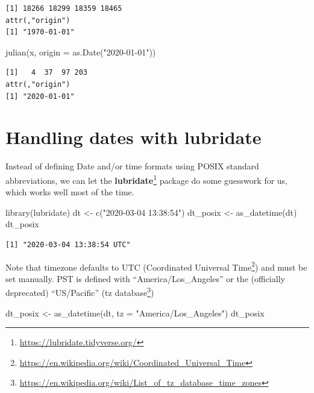 \documentclass[
]{book}
\newenvironment{Shaded}{\begin{snugshade}}{\end{snugshade}}
\newcommand{\AttributeTok}[1]{\textcolor[rgb]{0.77,0.63,0.00}{#1}}
\newcommand{\FunctionTok}[1]{\textcolor[rgb]{0.00,0.00,0.00}{#1}}
\newcommand{\NormalTok}[1]{#1}
\newcommand{\OtherTok}[1]{\textcolor[rgb]{0.56,0.35,0.01}{#1}}
\newcommand{\StringTok}[1]{\textcolor[rgb]{0.31,0.60,0.02}{#1}}
\DeclareRobustCommand{\href}[2]{#2\footnote{\url{#1}}}
\begin{document}
\begin{verbatim}
[1] 18266 18299 18359 18465
attr(,"origin")
[1] "1970-01-01"
\end{verbatim}

\begin{Shaded}
\begin{Highlighting}[]
\FunctionTok{julian}\NormalTok{(x, }\AttributeTok{origin =} \FunctionTok{as.Date}\NormalTok{(}\StringTok{"2020{-}01{-}01"}\NormalTok{))}
\end{Highlighting}
\end{Shaded}

\begin{verbatim}
[1]   4  37  97 203
attr(,"origin")
[1] "2020-01-01"
\end{verbatim}

\hypertarget{handling-dates-with-lubridate}{%
\section{\texorpdfstring{Handling dates with \textbf{lubridate}}{Handling dates with lubridate}}\label{handling-dates-with-lubridate}}

Instead of defining Date and/or time formats using POSIX standard abbreviations, we can let the \href{https://lubridate.tidyverse.org/}{\textbf{lubridate}} package do some guesswork for us, which works well most of the time.

\begin{Shaded}
\begin{Highlighting}[]
\FunctionTok{library}\NormalTok{(lubridate)}
\NormalTok{dt }\OtherTok{\textless{}{-}} \FunctionTok{c}\NormalTok{(}\StringTok{"2020{-}03{-}04 13:38:54"}\NormalTok{)}
\NormalTok{dt\_posix }\OtherTok{\textless{}{-}} \FunctionTok{as\_datetime}\NormalTok{(dt)}
\NormalTok{dt\_posix}
\end{Highlighting}
\end{Shaded}

\begin{verbatim}
[1] "2020-03-04 13:38:54 UTC"
\end{verbatim}

Note that timezone defaults to UTC (\href{https://en.wikipedia.org/wiki/Coordinated_Universal_Time}{Coordinated Universal Time}) and must be set manually. PST is defined with ``America/Los\_Angeles'' or the (officially deprecated) ``US/Pacific'' (\href{https://en.wikipedia.org/wiki/List_of_tz_database_time_zones}{tz database})

\begin{Shaded}
\begin{Highlighting}[]
\NormalTok{dt\_posix }\OtherTok{\textless{}{-}} \FunctionTok{as\_datetime}\NormalTok{(dt, }\AttributeTok{tz =} \StringTok{"America/Los\_Angeles"}\NormalTok{)}
\NormalTok{dt\_posix}
\end{Highlighting}
\end{Shaded}
\end{document}

